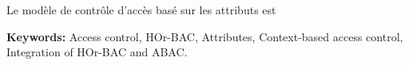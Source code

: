 \let\oldprintchaptertitle=\printchaptertitle
\renewcommand{\printchaptertitle}[1]{%
	\vspace*{-75pt}
	\oldprintchaptertitle{#1}
}%
\let\printchaptertitle=\oldprintchaptertitle
Le modèle de contrôle d'accès basé sur les attributs est  

\vspace{1cm}
\noindent\textbf{Keywords:} Access control, HOr-BAC, Attributes, Context-based access control, Integration of HOr-BAC and ABAC.

\myCleanStarChapterEnd

